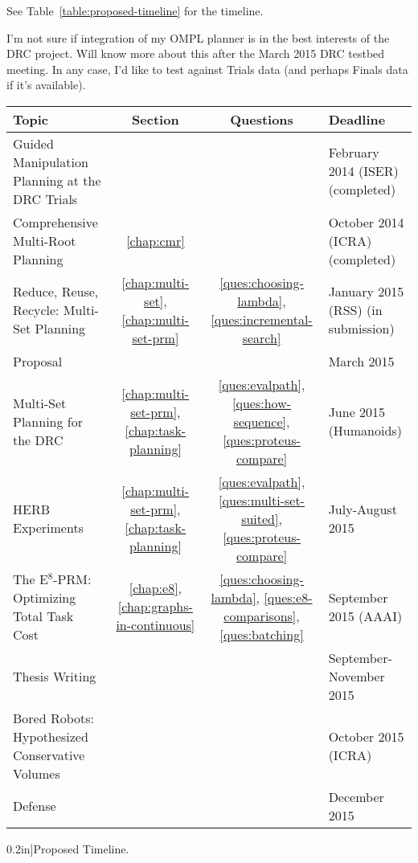 See Table~\ref{table:proposed-timeline} for the timeline.

I'm not sure if integration of my OMPL planner
is in the best interests of the DRC project.
Will know more about this after the March 2015 DRC testbed meeting.
In any case, I'd like to test against Trials data
(and perhaps Finals data if it's available).

\begin{table*}
   \begin{widepage}
   \centering
   {
   \renewcommand{\arraystretch}{1.5}
   \begin{tabular}{lccl}
   \toprule
   {\bf Topic} & {\bf Section} & {\bf Questions} & {\bf Deadline} \\
   \midrule
   Guided Manipulation Planning at the DRC Trials \citep{dellin2014drc}
      & %
      &
      & February 2014 (ISER) (completed) \\
   Comprehensive Multi-Root Planning \citep{dellin2015cmr}
      & \ref{chap:cmr}
      &
      & October 2014 (ICRA) (completed) \\
   Reduce, Reuse, Recycle: Multi-Set Planning \citep{dellin2015multiset}
      & \ref{chap:multi-set}, \ref{chap:multi-set-prm}
      & \ref{ques:choosing-lambda}, \ref{ques:incremental-search}
      & January 2015 (RSS) (in submission) \\
   \midrule
   Proposal
      & & & March 2015 \\
   Multi-Set Planning for the DRC
      & \ref{chap:multi-set-prm}, \ref{chap:task-planning}
      & \ref{ques:evalpath}, \ref{ques:how-sequence},
        \ref{ques:proteus-compare}
      & June 2015 (Humanoids) \\
   HERB Experiments
      & \ref{chap:multi-set-prm}, \ref{chap:task-planning}
      & \ref{ques:evalpath}, \ref{ques:multi-set-suited},
        \ref{ques:proteus-compare}
      & July-August 2015 \\
   The E$^8$-PRM: Optimizing Total Task Cost
      & \ref{chap:e8}, \ref{chap:graphs-in-continuous}
      & \ref{ques:choosing-lambda}, \ref{ques:e8-comparisons},
        \ref{ques:batching}
      & September 2015 (AAAI) \\
   Thesis Writing
      & & & September-November 2015 \\
   Bored Robots: Hypothesized Conservative Volumes
      & & & October 2015 (ICRA) \\
   Defense
      & & & December 2015 \\
   \bottomrule
   \end{tabular}
   } %
   \end{widepage}
   \caption[][0.2in]{Proposed Timeline.
   }
   \label{table:proposed-timeline}
\end{table*}

